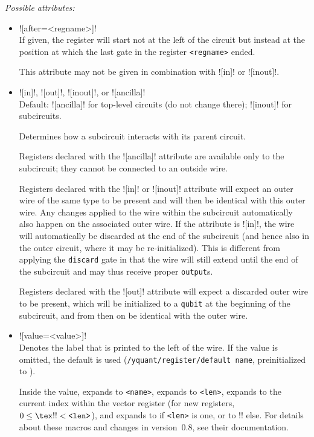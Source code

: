\documentclass{scrartcl}
\def\ttlink{\link\texttt}
\def\texlink{\link\tex}
\begin{document}
         \emph{Possible attributes:}
         \begin{itemize}
            \item \linkdef{[after]}\yquant![after=<regname>]! \\
               If given, the register will start not at the left of the circuit but instead at the position at which the last gate in the register \texttt{<regname>} ended.

               This attribute may not be given in combination with \yquant![in]! or \yquant![inout]!.
            \item \linkdef{[in]}\linkdef{[out]}\linkdef{[inout]}\linkdef{[ancilla]}\yquant![in]!, \yquant![out]!, \yquant![inout]!, or \yquant![ancilla]! \\
               Default: \yquant![ancilla]! for top\hyp level circuits (do not change there); \yquant![inout]! for subcircuits.

               Determines how a subcircuit interacts with its parent circuit.

               Registers declared with the \yquant![ancilla]! attribute are available only to the subcircuit; they cannot be connected to an outside wire.

               Registers declared with the \yquant![in]! or \yquant![inout]! attribute will expect an outer wire of the same type to be present and will then be identical with this outer wire.
               Any changes applied to the wire within the subcircuit automatically also happen on the associated outer wire.
               If the attribute is \yquant![in]!, the wire will automatically be discarded at the end of the subcircuit (and hence also in the outer circuit, where it may be re\hyp initialized).
               This is different from applying the \ttlink{discard} gate in that the wire will still extend until the end of the subcircuit and may thus receive proper \ttlink{output}s.

               Registers declared with the \yquant![out]! attribute will expect a discarded outer wire to be present, which will be initialized to a \texttt{qubit} at the beginning of the subcircuit, and from then on be identical with the outer wire.
            \item \yquant![value=<value>]! \\
               Denotes the label that is printed to the left of the wire.
               If the value is omitted, the default is used (\ttlink{/yquant/register/default name}, preinitialized to \texlink\regidx).

               Inside the value, \texlink{\reg} expands to \texttt{<name>}, \texlink{\len} expands to \texttt{<len>}, \texlink{\idx} expands to the current index within the vector register (for new registers, $0 \leq \text{\tex!\idx!} < \text{\texttt{<len>}}$), and \texlink{\regidx} expands to \texlink{\reg} if \texttt{<len>} is one, or to \tex!\reg[\idx]! else.
               For details about these macros and changes in version~0.8, see their documentation.
         \end{itemize}
\end{document}
